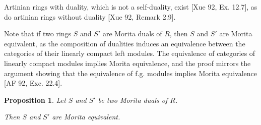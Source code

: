 \documentclass[11pt]{article}
\theoremstyle{plain}
\newtheorem{Prop}[veta]{Proposition}
\theoremstyle{remark}
\theoremstyle{plain}
\begin{document}
Artinian rings with duality, which is not a self-duality, exist [Xue 92, Ex. 12.7], as do artinian rings without duality [Xue 92, Remark 2.9].

\smallskip 

Note that if two rings $S$ and $S'$ are Morita duals of $R$, then $S$ and $S'$ are Morita equivalent, as the composition of dualities induces an equivalence between the categories of their linearly compact left modules. The equivalence of categories of linearly compact modules implies Morita equivalence, and the proof mirrors the argument showing that the equivalence of f.g. modules implies Morita equivalence [AF 92, Exc. 22.4].

\begin{Prop}\label{PropDual}
    Let $S$ and $S'$ be two Morita duals of $R$. 

    Then $S$ and $S'$ are Morita equivalent.
\end{Prop}
\end{document}
